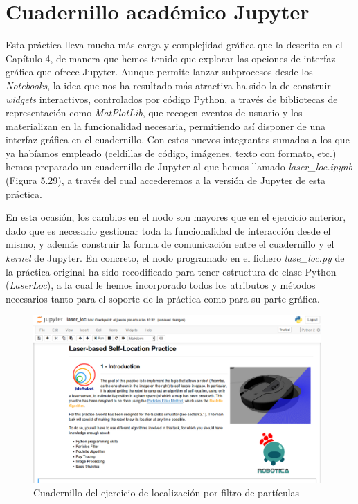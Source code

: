 \section{Cuadernillo académico Jupyter}
Esta práctica lleva mucha más carga y complejidad gráfica que la descrita en el Capítulo 4, de manera que hemos tenido que explorar las opciones de interfaz gráfica que ofrece Jupyter. Aunque permite lanzar subprocesos desde los \textit{Notebooks}, la idea que nos ha resultado más atractiva ha sido la de construir \textit{widgets} interactivos, controlados por código Python, a través de bibliotecas de representación como \textit{MatPlotLib}, que recogen eventos de usuario y los materializan en la funcionalidad necesaria, permitiendo así disponer de una interfaz gráfica en el cuadernillo. Con estos nuevos integrantes sumados a los que ya habíamos empleado (celdillas de código, imágenes, texto con formato, etc.) hemos preparado un cuadernillo de Jupyter al que hemos llamado \textit{laser\_loc.ipynb} (Figura 5.29), a través del cual accederemos a la versión de Jupyter de esta práctica. 

En esta ocasión, los cambios en el nodo son mayores que en el ejercicio anterior, dado que es necesario gestionar toda la funcionalidad de interacción desde el mismo, y además construir la forma de comunicación entre el cuadernillo y el \textit{kernel} de Jupyter. En concreto, el nodo programado en el fichero \textit{lase\_loc.py} de la práctica original ha sido recodificado para tener estructura de clase Python (\textit{LaserLoc}), a la cual le hemos incorporado todos los atributos y métodos necesarios tanto para el soporte de la práctica como para su parte gráfica. 

\begin{figure}[H]
	\begin{center}
		\includegraphics[width=0.98\textwidth]{figures/laserlocjupyter.png}
		\caption{Cuadernillo del ejercicio de localización por filtro de partículas}
		\label{fig.laserlocjupyter}
		\end{center}
\end{figure}

